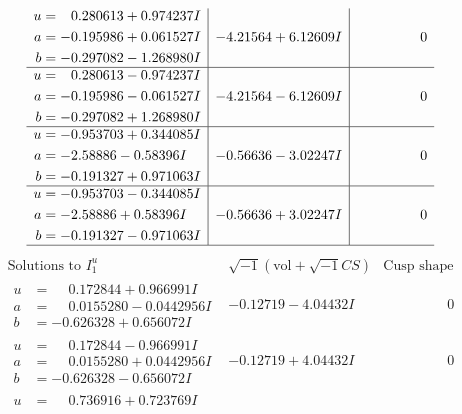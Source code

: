 \documentclass[1p]{elsarticle_modified}
\theoremstyle{definition}
\newcommand{\I}{\sqrt{-1}}
\begin{document}
$$\begin{array}{c|c|c}
\begin{aligned}
u &= \phantom{-}0.280613 + 0.974237 I \\
a &= -0.195986 + 0.061527 I \\
b &= -0.297082 - 1.268980 I\end{aligned}
 & -4.21564 + 6.12609 I & \phantom{-0.000000 } 0 \\ \hline\begin{aligned}
u &= \phantom{-}0.280613 - 0.974237 I \\
a &= -0.195986 - 0.061527 I \\
b &= -0.297082 + 1.268980 I\end{aligned}
 & -4.21564 - 6.12609 I & \phantom{-0.000000 } 0 \\ \hline\begin{aligned}
u &= -0.953703 + 0.344085 I \\
a &= -2.58886 - 0.58396 I \\
b &= -0.191327 + 0.971063 I\end{aligned}
 & -0.56636 - 3.02247 I & \phantom{-0.000000 } 0 \\ \hline\begin{aligned}
u &= -0.953703 - 0.344085 I \\
a &= -2.58886 + 0.58396 I \\
b &= -0.191327 - 0.971063 I\end{aligned}
 & -0.56636 + 3.02247 I & \phantom{-0.000000 } 0\\
 \hline 
 \end{array}$$\newpage$$\begin{array}{c|c|c}  
\text{Solutions to }I^u_{1}& \I (\text{vol} + \sqrt{-1}CS) & \text{Cusp shape}\\
 \hline 
\begin{aligned}
u &= \phantom{-}0.172844 + 0.966991 I \\
a &= \phantom{-}0.0155280 - 0.0442956 I \\
b &= -0.626328 + 0.656072 I\end{aligned}
 & -0.12719 - 4.04432 I & \phantom{-0.000000 } 0 \\ \hline\begin{aligned}
u &= \phantom{-}0.172844 - 0.966991 I \\
a &= \phantom{-}0.0155280 + 0.0442956 I \\
b &= -0.626328 - 0.656072 I\end{aligned}
 & -0.12719 + 4.04432 I & \phantom{-0.000000 } 0 \\ \hline\begin{aligned}
u &= \phantom{-}0.736916 + 0.723769 I \\

\end{aligned}
\end{array}$$
\end{document}
